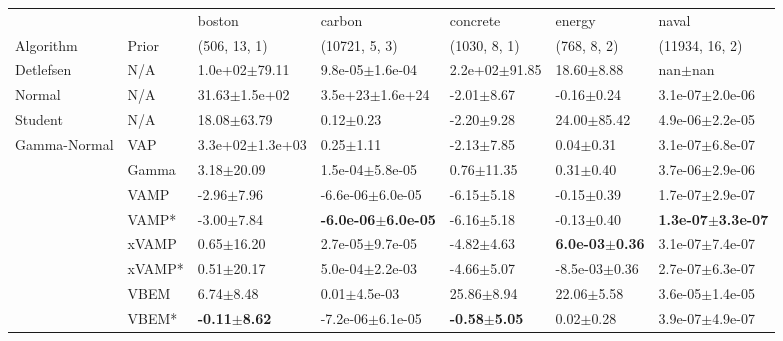 \begin{tabular}{lllllll}
\toprule
                  &       &                   boston &                         carbon &                 concrete &                     energy &                         naval \\
Algorithm & Prior& (506, 13, 1)& (10721, 5, 3)& (1030, 8, 1)& (768, 8, 2)& (11934, 16, 2)\\
\midrule
Detlefsen & N/A &        1.0e+02$\pm$79.11 &            9.8e-05$\pm$1.6e-04 &        2.2e+02$\pm$91.85 &             18.60$\pm$8.88 &                   nan$\pm$nan \\
Normal & N/A &        31.63$\pm$1.5e+02 &            3.5e+23$\pm$1.6e+24 &           -2.01$\pm$8.67 &             -0.16$\pm$0.24 &           3.1e-07$\pm$2.0e-06 \\
Student & N/A &          18.08$\pm$63.79 &                  0.12$\pm$0.23 &           -2.20$\pm$9.28 &            24.00$\pm$85.42 &           4.9e-06$\pm$2.2e-05 \\
Gamma-Normal & VAP &      3.3e+02$\pm$1.3e+03 &                  0.25$\pm$1.11 &           -2.13$\pm$7.85 &              0.04$\pm$0.31 &           3.1e-07$\pm$6.8e-07 \\
                  & Gamma &           3.18$\pm$20.09 &            1.5e-04$\pm$5.8e-05 &           0.76$\pm$11.35 &              0.31$\pm$0.40 &           3.7e-06$\pm$2.9e-06 \\
                  & VAMP &           -2.96$\pm$7.96 &           -6.6e-06$\pm$6.0e-05 &           -6.15$\pm$5.18 &             -0.15$\pm$0.39 &           1.7e-07$\pm$2.9e-07 \\
                  & VAMP* &           -3.00$\pm$7.84 &  \textbf{-6.0e-06$\pm$6.0e-05} &           -6.16$\pm$5.18 &             -0.13$\pm$0.40 &  \textbf{1.3e-07$\pm$3.3e-07} \\
                  & xVAMP &           0.65$\pm$16.20 &            2.7e-05$\pm$9.7e-05 &           -4.82$\pm$4.63 &  \textbf{6.0e-03$\pm$0.36} &           3.1e-07$\pm$7.4e-07 \\
                  & xVAMP* &           0.51$\pm$20.17 &            5.0e-04$\pm$2.2e-03 &           -4.66$\pm$5.07 &          -8.5e-03$\pm$0.36 &           2.7e-07$\pm$6.3e-07 \\
                  & VBEM &            6.74$\pm$8.48 &               0.01$\pm$4.5e-03 &           25.86$\pm$8.94 &             22.06$\pm$5.58 &           3.6e-05$\pm$1.4e-05 \\
                  & VBEM* &  \textbf{-0.11$\pm$8.62} &           -7.2e-06$\pm$6.1e-05 &  \textbf{-0.58$\pm$5.05} &              0.02$\pm$0.28 &           3.9e-07$\pm$4.9e-07 \\

\end{tabular}
